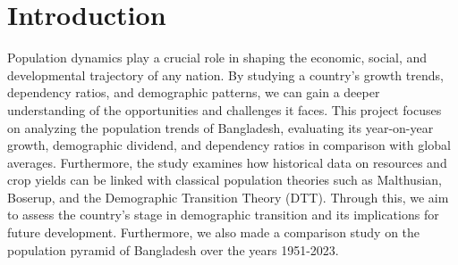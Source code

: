 \section{Introduction}
Population dynamics play a crucial role in shaping the economic, social, and developmental trajectory of any nation. By studying a country's growth trends, dependency ratios, and demographic patterns, we can gain a deeper understanding of the opportunities and challenges it faces. This project focuses on analyzing the population trends of Bangladesh, evaluating its year-on-year growth, demographic dividend, and dependency ratios in comparison with global averages. Furthermore, the study examines how historical data on resources and crop yields can be linked with classical population theories such as Malthusian, Boserup, and the Demographic Transition Theory (DTT). Through this, we aim to assess the country’s stage in demographic transition and its implications for future development. Furthermore, we also made a comparison study on the population pyramid of Bangladesh over the years 1951-2023.
